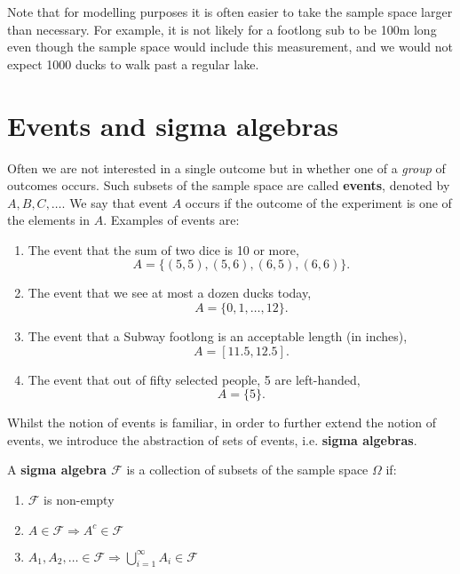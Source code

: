 Note that for modelling purposes it is often easier to take the sample 
space larger than necessary. For example, it is not likely for a footlong 
sub to be 100m long even though the sample space would include this measurement, 
and we would not expect 1000 ducks to walk past a regular lake. 

\section{Events and sigma algebras}

Often we are not interested in a single outcome but in whether 
one of a \textit{group} of outcomes occurs. Such subsets 
of the sample space are called \textbf{events}, denoted by \(A, B, C, \ldots \). 
We say that event \(A\) occurs if the outcome of the experiment is one of the elements in \(A\). 
\medskip
Examples of events are:

\begin{enumerate}
    \item The event that the sum of two dice is 10 or more, \[A = \{(5,5),(5,6),(6,5),(6,6)\}.\]
    \item The event that we see at most a dozen ducks today, \[A = \{0, 1, \ldots , 12\}.\]
    \item The event that a Subway footlong is an acceptable length (in inches), \[A = [11.5,12.5].\]
    \item The event that out of fifty selected people, 5 are left-handed, \[A = \{5\}.\]
\end{enumerate}


Whilst the notion of events is familiar, in order to further extend 
the notion of events, we introduce the abstraction of sets of events, i.e. \textbf{sigma algebras}. 


\begin{definition}\label{defn:sigma algebra}
    A \textbf{sigma algebra \(\mathcal{F}\)} is a collection of 
    subsets of the sample space \(\Omega\) if:
    \begin{enumerate}
        \item \(\mathcal{F}\) is non-empty
        \item \(A\in\mathcal{F}\Rightarrow A^c\in\mathcal{F}\)
        \item \(A_1, A_2,\ldots \in\mathcal{F}\Rightarrow \bigcup_{i=1}^\infty A_i\in\mathcal{F}\)
    \end{enumerate}
\end{definition}

